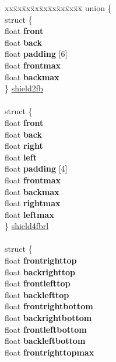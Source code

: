 \begin{DoxyCompactItemize}
\item 
\begin{tabbing}
xx\=xx\=xx\=xx\=xx\=xx\=xx\=xx\=xx\=\kill
union \{\\
\>struct \{\\
\>\>float {\bfseries front}\\
\>\>float {\bfseries back}\\
\>\>float {\bfseries padding} \mbox{[}6\mbox{]}\\
\>\>float {\bfseries frontmax}\\
\>\>float {\bfseries backmax}\\
\>\} \hyperlink{structShield_a4a69c963a18e6968ca40ca5eb8503561}{shield2fb}\\
\>\>\\
\>struct \{\\
\>\>float {\bfseries front}\\
\>\>float {\bfseries back}\\
\>\>float {\bfseries right}\\
\>\>float {\bfseries left}\\
\>\>float {\bfseries padding} \mbox{[}4\mbox{]}\\
\>\>float {\bfseries frontmax}\\
\>\>float {\bfseries backmax}\\
\>\>float {\bfseries rightmax}\\
\>\>float {\bfseries leftmax}\\
\>\} \hyperlink{structShield_a65159b025a5e6b5ff99b39c1a9ce6e2c}{shield4fbrl}\\
\>\>\\
\>struct \{\\
\>\>float {\bfseries frontrighttop}\\
\>\>float {\bfseries backrighttop}\\
\>\>float {\bfseries frontlefttop}\\
\>\>float {\bfseries backlefttop}\\
\>\>float {\bfseries frontrightbottom}\\
\>\>float {\bfseries backrightbottom}\\
\>\>float {\bfseries frontleftbottom}\\
\>\>float {\bfseries backleftbottom}\\
\>\>float {\bfseries frontrighttopmax}\\

\end{tabbing}
\end{DoxyCompactItemize}
